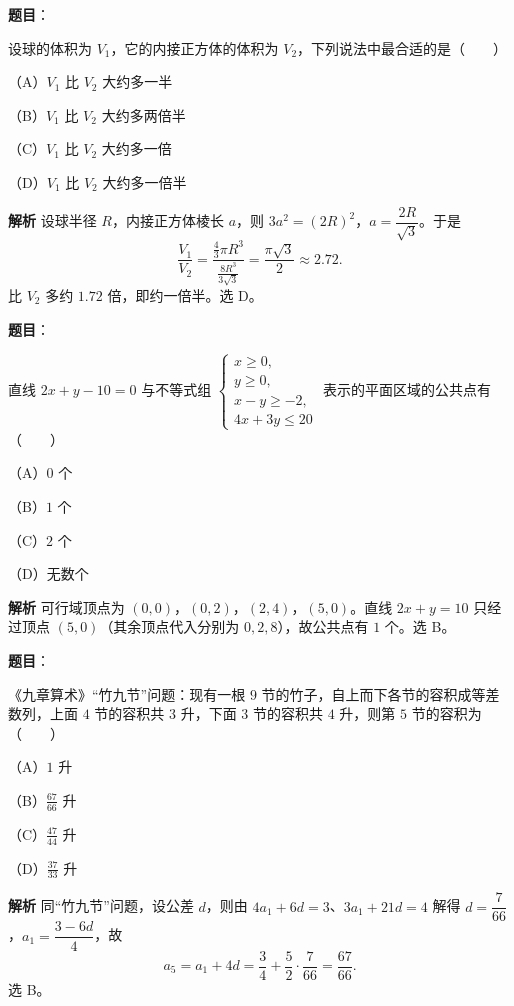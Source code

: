\begin{answer}

\textbf{题目}：

设球的体积为 $V_1$，它的内接正方体的体积为 $V_2$，下列说法中最合适的是\mbox{（　　）}

（A）$V_1$ 比 $V_2$ 大约多一半

（B）$V_1$ 比 $V_2$ 大约多两倍半

（C）$V_1$ 比 $V_2$ 大约多一倍

（D）$V_1$ 比 $V_2$ 大约多一倍半

\textbf{解析}
设球半径 $R$，内接正方体棱长 $a$，则 $3a^2=(2R)^2$，$a=\dfrac{2R}{\sqrt3}$。于是
\nopagebreak[4]
\[\frac{V_1}{V_2}=\frac{\frac43\pi R^3}{\frac{8R^3}{3\sqrt3}}=\frac{\pi\sqrt3}{2}\approx2.72.\]
比 $V_2$ 多约 $1.72$ 倍，即约一倍半。选 D。


\end{answer}
\begin{answer}

\textbf{题目}：

直线 $2x+y-10=0$ 与不等式组 $\begin{cases}x\geqslant0,\\y\geqslant0,\\x-y\geqslant-2,\\4x+3y\leqslant20\end{cases}$ 表示的平面区域的公共点有\mbox{（　　）}

（A）$0$ 个

（B）$1$ 个

（C）$2$ 个

（D）无数个

\textbf{解析}
可行域顶点为 $(0,0)$，$(0,2)$，$(2,4)$，$(5,0)$。直线 $2x+y=10$ 只经过顶点 $(5,0)$（其余顶点代入分别为 $0,2,8$），故公共点有 $1$ 个。选 B。


\end{answer}
\begin{answer}

\textbf{题目}：

《九章算术》“竹九节”问题：现有一根 $9$ 节的竹子，自上而下各节的容积成等差数列，上面 $4$ 节的容积共 $3$ 升，下面 $3$ 节的容积共 $4$ 升，则第 $5$ 节的容积为\mbox{（　　）}

（A）$1$ 升

（B）$\frac{67}{66}$ 升

（C）$\frac{47}{44}$ 升

（D）$\frac{37}{33}$ 升

\textbf{解析}
同“竹九节”问题，设公差 $d$，则由 $4a_1+6d=3$、$3a_1+21d=4$ 解得 $d=\dfrac7{66}$，$a_1=\dfrac{3-6d}4$，故
\nopagebreak[4]
\[a_5=a_1+4d=\frac34+\frac52\cdot\frac7{66}=\frac{67}{66}.\]
选 B。


\end{answer}
